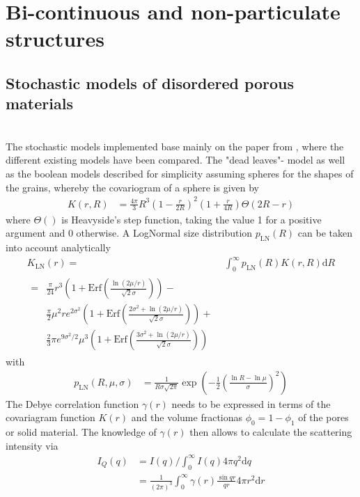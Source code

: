 \section{Bi-continuous and non-particulate structures}

\subsection{Stochastic models of disordered porous materials}~\\

The stochastic models implemented base mainly on the paper from \cite{Gommes2018}, where the different existing models have been  compared. The "dead leaves"- model as well as the boolean models described for simplicity assuming spheres for the shapes of the grains, whereby the covariogram of a sphere is given by
\begin{align}\label{eq:covariogram_sphere}
K(r,R) &= \frac{4\pi}{3}R^3\left(1-\frac{r}{2R}\right)^2\left(1+\frac{r}{4R}\right)\Theta(2R-r)
\end{align}
where $\Theta()$ is Heavyside's step function, taking the value 1 for a positive argument and 0 otherwise. A LogNormal size distribution $p_\mathrm{LN}(R)$ can be taken into account analytically
\begin{align}
  K_\mathrm{LN}(r) =& \int_0^\infty  p_\mathrm{LN}(R) K(r,R) \mathrm{d}R \nonumber\\
       \begin{split}
            =& \frac{\pi}{24} r^3 \left(1+\mathrm{Erf}\left(\frac{\ln(2\mu/r)}{\sqrt{2}\sigma}\right)\right) -\\
            & \frac{\pi}{2}\mu^2r e^{2\sigma^2} \left(1+\mathrm{Erf}\left(\frac{2\sigma^2+\ln(2\mu/r)}{\sqrt{2}\sigma}\right)\right) +\\
            & \frac23 \pi e^{9\sigma^2/2}\mu^3\left(1+\mathrm{Erf}\left(\frac{3\sigma^2+\ln(2\mu/r)}{\sqrt{2}\sigma}\right)\right)
       \end{split} \label{eq:covariogram_sphere_LogNorm}
\end{align}
with
\begin{align}
  p_\mathrm{LN}(R,\mu,\sigma) &=  \frac{1}{R\sigma \sqrt{2 \pi}}\exp\left(-\frac{1}{2}\left(\frac{\ln R -
        \ln\mu}{\sigma}\right)^2\right)
\end{align}
The Debye correlation function $\gamma(r)$ needs to be expressed in terms of the covariagram function $K(r)$ and the volume fractionas $\phi_0=1-\phi_1$ of the pores or solid material. The knowledge of $\gamma(r)$ then allows to calculate the scattering intensity via
\begin{align}
  I_Q(q) &= I(q)/\int_0^\infty I(q) 4\pi q^2 \mathrm{d}q \\
         &= \frac{1}{(2\pi)^3} \int_0^\infty \gamma(r) \frac{\sin qr}{qr}4\pi r^2\mathrm{d}r
\end{align}

